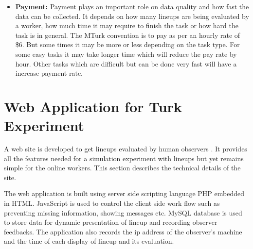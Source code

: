 \documentclass[11pt]{article}
\begin{document}
\begin{itemize}
\item {\bf Payment:} Payment plays an important role on data quality and how fast the data can be collected. It depends on how many lineups are being evaluated by a worker, how much time it may require to finish the task or how hard the task is in general. The MTurk convention is to pay as per an hourly rate of \$6. But some times it may be more or less depending on the task type. For some easy tasks it may take longer time which will reduce the pay rate by hour. Other tasks which are difficult but can be done very fast will have a increase payment rate.

%
%
%
%
%
%

\end{itemize}


\section{Web Application for Turk Experiment} \label{sec:web_application}

A web site is developed to get lineups evaluated by human observers \citep{majumder:turk}. It provides all the features needed for a simulation experiment with lineups but yet remains simple for the online workers. This section describes the technical details of the site. 

The web application is built using server side scripting language PHP embedded in HTML. JavaScript is used to control the client side work flow such as preventing missing information, showing messages etc. MySQL database is used to store data for dynamic presentation of lineup and recording observer feedbacks. The application also records the ip address of the observer's machine and the time of each display of lineup and its evaluation.  

\end{document}

